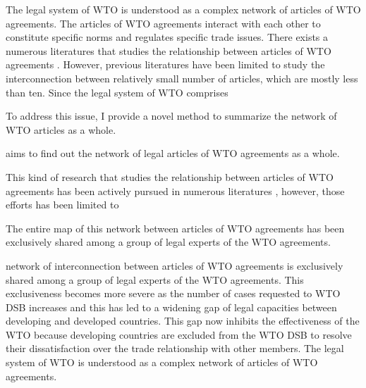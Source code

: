 

The legal system of WTO is understood as a complex network of articles of WTO agreements.
The articles of WTO agreements interact with each other to constitute specific norms and regulates specific trade issues.
There exists a numerous literatures that studies the relationship between articles of WTO agreements \citep{chadXXIII, charnovitz, Trachtman, who_gets}.
However, previous literatures have been limited to study the interconnection between relatively small number of articles, which are mostly less than ten. %
Since the legal system of WTO comprises 


To address this issue, I provide a novel method to summarize the network of WTO articles as a whole.




aims to find out the network of legal articles of WTO agreements as a whole.

This kind of research that studies the relationship between articles of WTO agreements has been actively pursued in numerous literatures \citep{chadXXIII, charnovitz, Trachtman, who_gets}, however, those efforts has been limited to


The entire map of this network between articles of WTO agreements has been exclusively shared among a group of legal experts of the WTO agreements.



network of interconnection between articles of WTO agreements is exclusively shared among a group of legal experts of the WTO agreements. 
This exclusiveness becomes more severe as the number of cases requested to WTO DSB increases and this has led to a widening gap of legal capacities between developing and developed countries.
This gap now inhibits the effectiveness of the WTO because developing countries are excluded from the WTO DSB to resolve their dissatisfaction over the trade relationship with other members.
The legal system of WTO is understood as a complex network of articles of WTO agreements.




